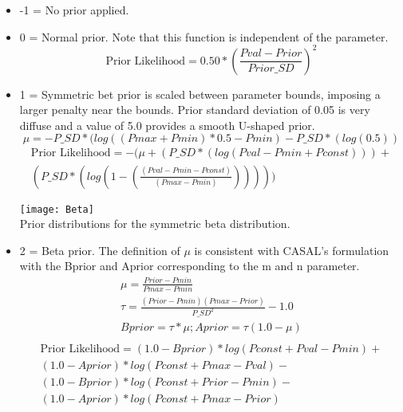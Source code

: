 \begin{itemize}
	\item -1 = No prior applied.
	\item  0 = Normal prior. Note that this function is independent of the parameter.
	\begin{equation}
		\text{Prior Likelihood} = 0.50*(\frac{Pval - Prior}{Prior\_SD})^2
	\end{equation}
	\item  1 = Symmetric bet prior is scaled between parameter bounds, imposing a larger penalty near the bounds.  Prior standard deviation of 0.05 is very diffuse and a value of 5.0 provides a smooth U-shaped prior.
	\begin{equation}  \mu = -P\_SD*(log((Pmax+Pmin)*0.5-Pmin)-P\_SD*(log(0.5)) \end{equation}
	\begin{equation}
		\begin{split}
			\text{Prior Likelihood} = -(\mu + (P\_SD*(log(Pval-Pmin+Pconst))) + \\
			(P\_SD*(log(1-(\frac{(Pval-Pmin-Pconst)}{(Pmax-Pmin)})))))
		\end{split}
	\end{equation}

	\begin{center}
			\texttt{[image: Beta]}\\
			Prior distributions for the symmetric beta distribution.
	\end{center}

	\item 2 = Beta prior.  The definition of $\mu$ is consistent with CASAL's formulation with the Bprior and Aprior corresponding to the m and n parameter.
	\begin{equation}
		\begin{split}
			\mu = \frac{Prior-Pmin}{Pmax-Pmin} \\
			\tau  = \frac{(Prior-Pmin)(Pmax-Prior)}{P\_SD^2}-1.0\\
			Bprior  = \tau*\mu; Aprior = \tau (1.0-\mu)\\
		\end{split}
	\end{equation}
		\begin{equation}
		\begin{split}
		\text{Prior Likelihood} = (1.0-Bprior)*log(Pconst+Pval-Pmin) + \\
		(1.0-Aprior)*log(Pconst+Pmax-Pval) - \\
		(1.0-Bprior)*log(Pconst + Prior - Pmin) - \\
		(1.0-Aprior)*log(Pconst + Pmax - Prior)
		\end{split}
	\end{equation}


\end{itemize}
